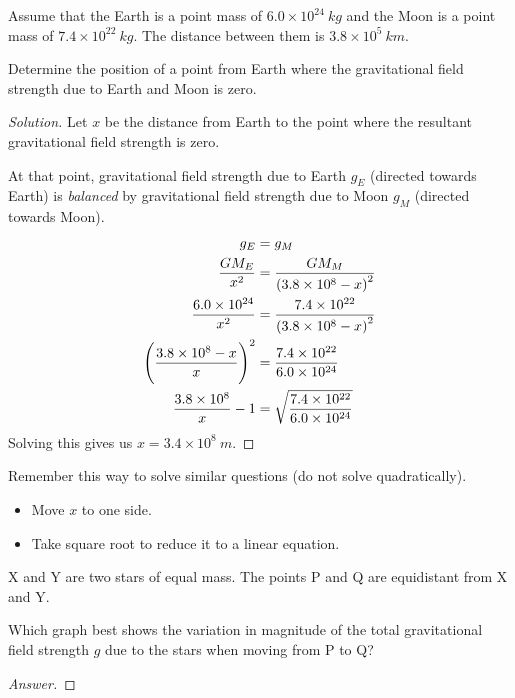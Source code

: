 \begin{prbm}
Assume that the Earth is a point mass of $6.0\times10^{24}\:\unit{kg}$ and the Moon is a point mass of $7.4\times10^{22}\:\unit{kg}$. The distance between them is $3.8\times10^5\:\unit{km}$. 

Determine the position of a point from Earth where the gravitational field strength due to Earth and Moon is zero.
\end{prbm}

\begin{proof}[Solution]
Let $x$ be the distance from Earth to the point where the resultant gravitational field strength is zero.

At that point, gravitational field strength due to Earth $g_E$ (directed towards Earth) is \emph{balanced} by gravitational field strength due to Moon $g_M$ (directed towards Moon).
\begin{align*}
g_E &= g_M \\
\frac{GM_E}{x^2} &= \frac{GM_M}{\left(3.8\times10^8-x\right)^2} \\
\frac{6.0\times10^{24}}{x^2} &= \frac{7.4\times10^{22}}{\left(3.8\times10^8-x\right)^2} \\
\left(\frac{3.8\times10^8-x}{x}\right)^2 &= \frac{7.4\times10^{22}}{6.0\times10^{24}} \\
\frac{3.8\times10^8}{x}-1 &= \sqrt{\frac{7.4\times10^{22}}{6.0\times10^{24}}}
\end{align*}
Solving this gives us $x=3.4\times10^8\:\unit{m}$.
\end{proof}
\begin{remark}
Remember this way to solve similar questions (do not solve quadratically).
\begin{itemize}
\item Move $x$ to one side.
\item Take square root to reduce it to a linear equation.
\end{itemize}
\end{remark}
\pagebreak

\begin{prbm}[2014 P1 Q13]
X and Y are two stars of equal mass. The points P and Q are equidistant from X and Y.

Which graph best shows the variation in magnitude of the total gravitational field strength $g$ due to the stars when moving from P to Q?
\end{prbm}

\begin{proof}[Answer]

\end{proof}

